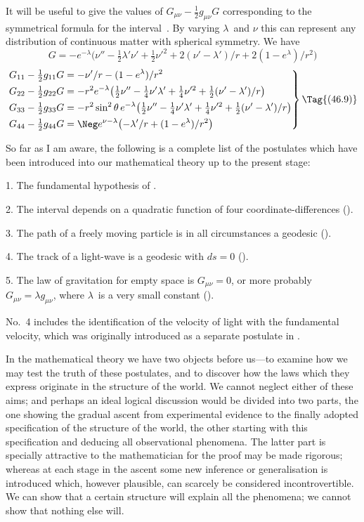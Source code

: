 \documentclass[12pt]{book}
\begin{document}
It will be useful to give the values of $G_{\mu\nu} - \frac{1}{2} g_{\mu\nu} G$ corresponding to the
symmetrical formula for the interval~. By varying $\lambda$~and $\nu$ this can represent
any distribution of continuous matter with spherical symmetry. We have
\[
G = -e^{-\lambda} \bigl(\nu'' - \tfrac{1}{2}\lambda'\nu' + \tfrac{1}{2}\nu'^{2} + 2(\nu' - \lambda')/r + 2(1 - e^{\lambda})/r^{2}\bigr)
\]
\[\left.
\begin{aligned}
  &G_{11} - \tfrac{1}{2} g_{11} G
  = -\nu'/r - (1 - e^{\lambda})/r^{2}\\
  &G_{22} - \tfrac{1}{2} g_{22} G
 = -r^{2} e^{-\lambda} \bigl(\tfrac{1}{2}\nu'' - \tfrac{1}{4}\nu'\lambda' + \tfrac{1}{4}\nu'^{2} + \tfrac{1}{2}(\nu' - \lambda')/r\bigr)\\
  &G_{33} - \tfrac{1}{2} g_{33} G
 = -r^{2}\sin^{2}\theta\, e^{-\lambda} \bigl(\tfrac{1}{2}\nu'' - \tfrac{1}{4}\nu'\lambda' + \tfrac{1}{4}\nu'^{2} + \tfrac{1}{2}(\nu' - \lambda')/r\bigr)\\
  &G_{44} - \tfrac{1}{2} g_{44} G
  = \Neg e^{\nu-\lambda} \bigl(-\lambda'/r + (1 - e^{\lambda})/r^{2}\bigr)
\end{aligned}
\right\}
\Tag{(46.9)}
\]

%

So far as I am aware, the following is a complete list of the postulates
which have been introduced into our mathematical theory up to the present
stage:

1. The fundamental hypothesis of .

2. The interval depends on a quadratic function of four coordinate-differences
().

3. The path of a freely moving particle is in all circumstances a geodesic
().

4. The track of a light-wave is a geodesic with $ds = 0$ ().

5. The law of gravitation for empty space is $G_{\mu\nu} = 0$, or more probably
$G_{\mu\nu} = \lambda g_{\mu\nu}$, where $\lambda$~is a very small constant ().

No.~4 includes the identification of the velocity of light with the fundamental
velocity, which was originally introduced as a separate postulate in .

In the mathematical theory we have two objects before us---to examine
how we may test the truth of these postulates, and to discover how the laws
which they express originate in the structure of the world. We cannot neglect
either of these aims; and perhaps an ideal logical discussion would be divided
into two parts, the one showing the gradual ascent from experimental evidence
to the finally adopted specification of the structure of the world, the other
starting with this specification and deducing all observational phenomena.
The latter part is specially attractive to the mathematician for the proof may
be made rigorous; whereas at each stage in the ascent some new inference or
generalisation is introduced which, however plausible, can scarcely be considered
incontrovertible. We can show that a certain structure will explain
all the phenomena; we cannot show that nothing else will.
\end{document}

